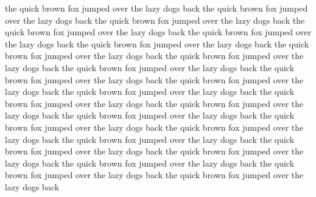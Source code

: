 the quick brown fox jumped over the lazy dogs back
the quick brown fox jumped over the lazy dogs back
the quick brown fox jumped over the lazy dogs back
the quick brown fox jumped over the lazy dogs back
the quick brown fox jumped over the lazy dogs back
the quick brown fox jumped over the lazy dogs back
the quick brown fox jumped over the lazy dogs back
the quick brown fox jumped over the lazy dogs back
the quick brown fox jumped over the lazy dogs back
the quick brown fox jumped over the lazy dogs back
the quick brown fox jumped over the lazy dogs back
the quick brown fox jumped over the lazy dogs back
the quick brown fox jumped over the lazy dogs back
the quick brown fox jumped over the lazy dogs back
the quick brown fox jumped over the lazy dogs back
the quick brown fox jumped over the lazy dogs back
the quick brown fox jumped over the lazy dogs back
the quick brown fox jumped over the lazy dogs back
the quick brown fox jumped over the lazy dogs back
the quick brown fox jumped over the lazy dogs back
the quick brown fox jumped over the lazy dogs back
the quick brown fox jumped over the lazy dogs back
the quick brown fox jumped over the lazy dogs back
